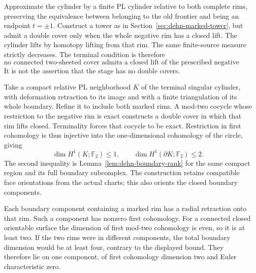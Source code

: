 Approximate the cylinder by a finite PL cylinder relative to both
complete rims, preserving the equivalence between belonging to the
old frontier and being an endpoint $t=\pm1$.  Construct a tower as
in Section~\ref{sec:dehn-marked-tower}, but admit a double cover only
when the whole negative rim has a closed lift.  The cylinder lifts
by homotopy lifting from that rim.  The same finite-source measure
strictly decreases.  The terminal condition is therefore
\[
 \text{no connected two-sheeted cover admits a closed lift
 of the prescribed negative rim.}
\]
It is not the assertion that the stage has no double covers.

Take a compact relative PL neighborhood $K$ of the terminal singular
cylinder, with deformation retraction to its image and with a finite
triangulation of its whole boundary.  Refine it to include both marked
rims.  A mod-two cocycle whose restriction to the negative rim is
exact constructs a double cover in which that rim lifts closed.
Terminality forces that cocycle to be exact.  Restriction in first
cohomology is thus injective into the one-dimensional cohomology of
the circle, giving
\[
       \dim H^1(K;\mathbb F_2)\leq1,
       \qquad \dim H^1(\partial K;\mathbb F_2)\leq2.
\]
The second inequality is Lemma~\ref{lem:dehn-boundary-rank} for the
same compact region and its full boundary subcomplex.  The construction
retains compatible face orientations from the actual charts; this
also orients the closed boundary components.

Each boundary component containing a marked rim has a radial
retraction onto that rim.  Such a component has nonzero first
cohomology.  For a connected closed orientable surface the dimension
of first mod-two cohomology is even, so it is at least two.  If the
two rims were in different components, the total boundary dimension
would be at least four, contrary to the displayed bound.  They
therefore lie on one component, of first cohomology dimension two
and Euler characteristic zero.

